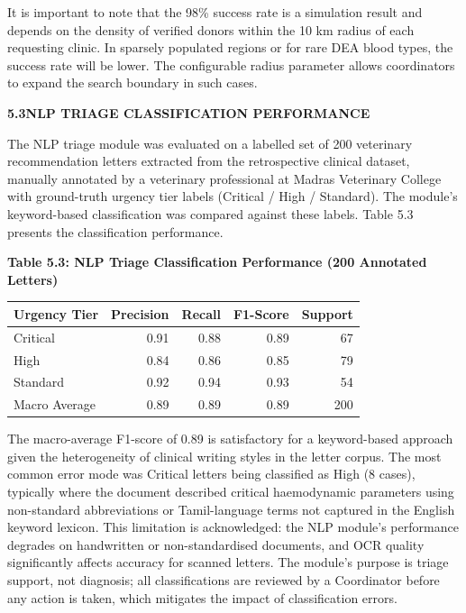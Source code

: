 \documentclass[12pt,a4paper]{article}
\begin{document}
\noindent It is important to note that the 98\% success rate is a simulation result and depends on the density of verified donors within the 10 km radius of each requesting clinic. In sparsely populated regions or for rare DEA blood types, the success rate will be lower. The configurable radius parameter allows coordinators to expand the search boundary in such cases.

\vspace{1.5em}
\noindent\textbf{5.3\quad NLP TRIAGE CLASSIFICATION PERFORMANCE}
\vspace{0.6em}

\noindent The NLP triage module was evaluated on a labelled set of 200 veterinary recommendation letters extracted from the retrospective clinical dataset, manually annotated by a veterinary professional at Madras Veterinary College with ground-truth urgency tier labels (Critical / High / Standard). The module's keyword-based classification was compared against these labels. Table 5.3 presents the classification performance.

\begin{center}
\textbf{Table 5.3: NLP Triage Classification Performance (200 Annotated Letters)}
\vspace{0.4em}
\begin{tabular}{lrrrr}
\toprule
\textbf{Urgency Tier} & \textbf{Precision} & \textbf{Recall} & \textbf{F1-Score} & \textbf{Support} \\
\midrule
Critical & 0.91 & 0.88 & 0.89 & 67 \\
High & 0.84 & 0.86 & 0.85 & 79 \\
Standard & 0.92 & 0.94 & 0.93 & 54 \\
\midrule
Macro Average & 0.89 & 0.89 & 0.89 & 200 \\
\bottomrule
\end{tabular}
\end{center}

\noindent The macro-average F1-score of 0.89 is satisfactory for a keyword-based approach given the heterogeneity of clinical writing styles in the letter corpus. The most common error mode was Critical letters being classified as High (8 cases), typically where the document described critical haemodynamic parameters using non-standard abbreviations or Tamil-language terms not captured in the English keyword lexicon. This limitation is acknowledged: the NLP module's performance degrades on handwritten or non-standardised documents, and OCR quality significantly affects accuracy for scanned letters. The module's purpose is triage support, not diagnosis; all classifications are reviewed by a Coordinator before any action is taken, which mitigates the impact of classification errors.
\end{document}
